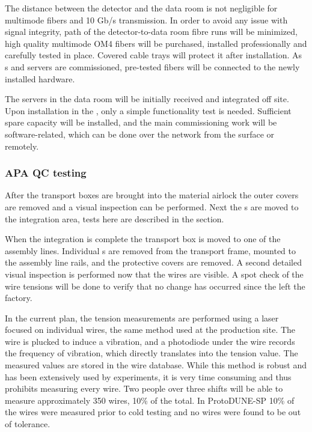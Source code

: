 The distance between the detector and the data room is not negligible for multimode fibers and 10 Gb/s transmission. 
In order to avoid any issue with signal integrity, path of the detector-to-data room fibre runs will be minimized, high quality multimode OM4 fibers will be purchased, installed professionally and carefully tested in place.
Covered cable trays will protect it after installation.  As s and servers are commissioned, pre-tested fibers will be connected to the newly installed hardware.

The  servers in the  data room will be initially received and integrated off site.  Upon installation in the , only a simple functionality test is needed.  Sufficient spare capacity will be installed, and the main commissioning work will be software-related, which can be done over the network from the surface or remotely.

\subsubsection{APA QC testing}

After the  transport boxes are brought into the material airlock the outer covers are removed and a visual inspection can be performed. Next the s are moved to the  integration area, tests here are described in the   section. 

When the  integration is complete the  transport box is moved to one of the  assembly lines. Individual s are removed from the transport frame, mounted to the assembly line rails, and the protective covers are removed. A second detailed visual inspection is performed now that the wires are visible. A spot check of the wire tensions will be done to verify that no change has occurred since the  left the factory.

 
In the current plan, the tension measurements are performed using a laser focused on individual wires, the same method used at the production site. 
The wire is plucked to induce a vibration, and a photodiode under the wire records the frequency of vibration, which directly translates into the tension value. 
The measured values are stored in the wire  database. 
While this method is robust and has been extensively used by  experiments, it is very time consuming and thus prohibits measuring every wire. 
Two people over three shifts will be able to measure approximately 350 wires, 10\% of the total. In ProtoDUNE-SP 10\% of the wires were measured prior to cold testing and no wires were found to be out of tolerance.

